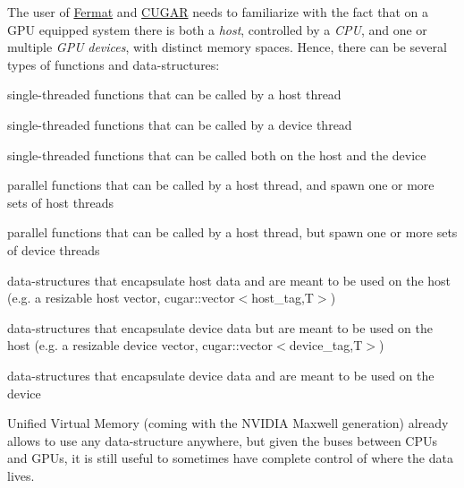 \begin{DoxyParagraph}{}
The user of \hyperlink{index}{Fermat} and \hyperlink{cugar_page}{C\+U\+G\+AR} needs to familiarize with the fact that on a G\+PU equipped system there is both a {\itshape host}, controlled by a {\itshape C\+PU}, and one or multiple {\itshape G\+PU} {\itshape devices}, with distinct memory spaces. Hence, there can be several types of functions and data-\/structures\+: 
\end{DoxyParagraph}
\begin{DoxyParagraph}{}

\begin{DoxyItemize}
\item single-\/threaded functions that can be called by a host thread
\item single-\/threaded functions that can be called by a device thread
\item single-\/threaded functions that can be called both on the host and the device
\item parallel functions that can be called by a host thread, and spawn one or more sets of host threads
\item parallel functions that can be called by a host thread, but spawn one or more sets of device threads 
\end{DoxyItemize}
\end{DoxyParagraph}
\begin{DoxyParagraph}{}

\begin{DoxyItemize}
\item data-\/structures that encapsulate host data and are meant to be used on the host (e.\+g. a resizable host vector, cugar\+::vector$<$host\+\_\+tag,\+T$>$)
\item data-\/structures that encapsulate device data but are meant to be used on the host (e.\+g. a resizable device vector, cugar\+::vector$<$device\+\_\+tag,\+T$>$)
\item data-\/structures that encapsulate device data and are meant to be used on the device 
\end{DoxyItemize}
\end{DoxyParagraph}
\begin{DoxyParagraph}{}
Unified Virtual Memory (coming with the N\+V\+I\+D\+IA Maxwell generation) already allows to use any data-\/structure anywhere, but given the buses between C\+P\+Us and G\+P\+Us, it is still useful to sometimes have complete control of where the data lives.
\end{DoxyParagraph}
